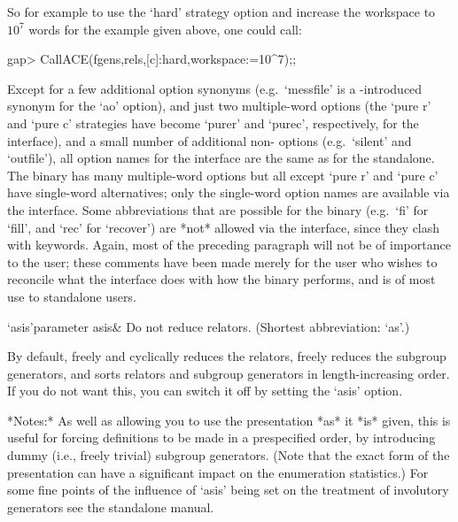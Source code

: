 So  for example to  use the  `hard' strategy  option and  increase the
workspace to $10^7$ words for the example given above, one could call:

\begintt
gap> CallACE(fgens,rels,[c]:hard,workspace:=10^7);;
\endtt

Except for a few additional option synonyms (e.g.~`messfile' is a 
{\GAP}-introduced synonym for the `ao' {\ACE} option), and just two
multiple-word {\ACE} options (the `pure r' and `pure c' strategies
have become `purer' and `purec', respectively, for the {\GAP} interface),
and a small number of additional non-{\ACE} options (e.g.~`silent'
and `outfile'), all option names for the interface are the same as for
the {\ACE} standalone. The {\ACE} binary has many multiple-word options
but all except `pure r' and `pure c' have single-word alternatives;
only the single-word option names are available via the {\GAP} interface.
Some abbreviations that are possible for the {\ACE} binary (e.g.~`fi'
for `fill', and `rec' for `recover') are *not* allowed via the {\GAP}
interface, since they clash with {\GAP} keywords. Again, most of the
preceding paragraph will not be of importance to the {\GAP} user;
these comments have been made merely for the user who wishes to reconcile
what the interface does with how the {\ACE} binary performs, and is
of most use to standalone users.


\beginitems
\>`asis'{parameter asis}&
Do not reduce relators. (Shortest abbreviation: `as'.)
\enditems

By default, {\ACE} freely  and cyclically reduces the relators, freely
reduces  the  subgroup generators,  and  sorts  relators and  subgroup
generators in length-increasing  order.  If you do not  want this, you
can switch it off by setting the `asis' option.

*Notes:* As well as allowing you  to use the presentation *as* it *is*
given,  this  is  useful for  forcing  definitions  to  be made  in  a
prespecified  order,  by  introducing  dummy  (i.e.,  freely  trivial)
subgroup generators.   (Note that the  exact form of  the presentation
can  have a significant  impact on  the enumeration  statistics.)  For
some fine points of the influence of `asis' being set on the treatment
of involutory generators see the {\ACE} standalone manual.



